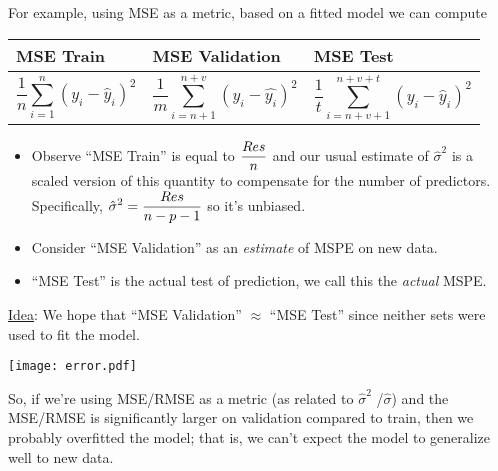 For example, using MSE as a metric, based on a fitted model we can
compute
\begin{table}[ht]
    \centering
    \begin{tabularx}{\linewidth}{@{}YYY@{}}
        \toprule
        MSE Train & MSE Validation & MSE Test \\
        \midrule
        \[ \frac{1}{n} \sum_{i=1}^{n} (y_i-\hat{y}_i)^2 \]
                  &
        \[ \frac{1}{m} \sum_{i=n+1}^{n+v} (y_i-\hat{y_i})^2 \]
                  &
        \[ \frac{1}{t} \sum_{i=n+v+1}^{n+v+t}(y_i-\hat{y}_i)^2  \]
        \\
        \bottomrule
    \end{tabularx}
\end{table}

\begin{itemize}
    \item Observe ``MSE Train'' is equal to $ \displaystyle \frac{\relax{Res}}{n} $
          and our usual estimate of $ \hat{\sigma}^2 $
          is a scaled version of this quantity
          to compensate for the number of predictors. Specifically,
          $ \displaystyle  \hat{\sigma}^2=\frac{\relax{Res}}{n-p-1} $
          so it's unbiased.
    \item Consider ``MSE Validation'' as an \emph{estimate} of MSPE
          on new data.
    \item ``MSE Test'' is the actual test of prediction,
          we call this the \emph{actual} MSPE.\
\end{itemize}
\underline{Idea}: We hope that ``MSE Validation'' $ \approx $
``MSE Test'' since neither sets were used to fit the model.

\begin{minipage}{0.7\textwidth}
    \texttt{[image: error.pdf]}
\end{minipage}
\begin{minipage}{0.23\textwidth}
    \raggedright{}
    So, if we're using MSE/RMSE
    as a metric (as related to $ \hat{\sigma}^2 $ /$ \hat{\sigma} $)
    and the MSE/RMSE is significantly larger
    on validation compared to train,
    then we probably overfitted the model;
    that is, we can't expect the model
    to generalize well to new data.
\end{minipage}

